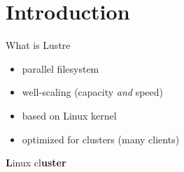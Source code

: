 \section{Introduction}

\begin{frame}{What is Lustre}
    \begin{itemize}
        \item parallel filesystem
        \item well-scaling (capacity \emph{and} speed)
        \item based on Linux kernel
        \item optimized for clusters (many clients)
    \end{itemize}

    \pause
    \vspace{1cm}
    \center \LARGE \textbf{L}inux cl\textbf{uster}
\end{frame}


